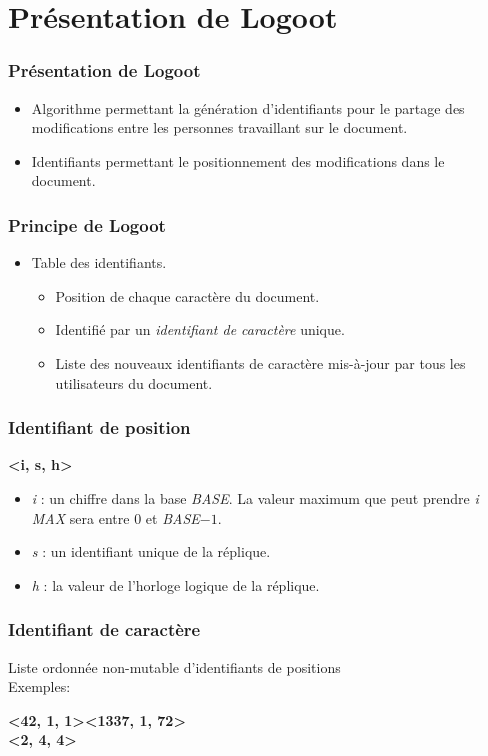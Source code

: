 \section{Présentation de Logoot}
  \begin{frame}
    \frametitle{Présentation de Logoot}
    \begin{itemize}
      \item Algorithme permettant la génération d'identifiants pour le partage des modifications entre les personnes travaillant sur le document.
      \item Identifiants permettant le positionnement des modifications dans le document.
    \end{itemize}
  \end{frame}

\begin{frame}
    \frametitle{Principe de Logoot}
    \begin{itemize}
      \item Table des identifiants.
      \begin{itemize}
      	\item Position de chaque caractère du document.
      	\item Identifié par un \emph{identifiant de caractère} unique.
      	\item Liste des nouveaux identifiants de caractère mis-à-jour par tous les utilisateurs du document.
      \end{itemize}
    \end{itemize}
  \end{frame}

\begin{frame}  
  \frametitle{Identifiant de position}
	\begin{center}
		\textbf{<i, s, h>}
	\end{center}
		\begin{itemize}
			\item \emph{i} : un chiffre dans la base \emph{BASE}. La valeur
			maximum que peut prendre \emph{i} \emph{MAX} sera entre $0$ et
			\emph{BASE}$ - 1$.
			\item \emph{s} : un identifiant unique de la réplique.
			\item \emph{h} : la valeur de l'horloge logique de la réplique.
		\end{itemize}
  \end{frame}

\begin{frame}  
  \frametitle{Identifiant de caractère}
  	Liste ordonnée non-mutable d'identifiants de positions\\
  	Exemples:
	\begin{center}
		\textbf{<42, 1, 1><1337, 1, 72>}\\
		\textbf{<2, 4, 4>}
	\end{center}
  \end{frame}
  
